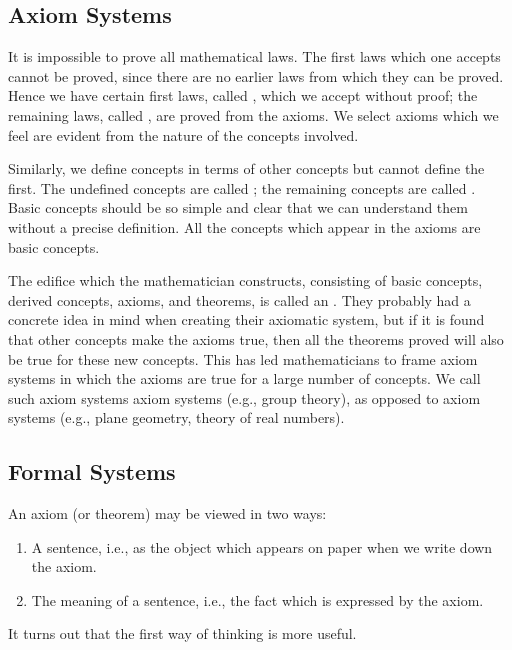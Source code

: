 \subsection{Axiom Systems}

It is impossible to prove all mathematical laws. The first laws which one accepts cannot be proved, since there are no earlier laws from which they can be proved.
Hence we have certain first laws, called , which we accept without proof; the remaining laws, called , are proved from the axioms.
We select axioms which we feel are evident from the nature of the concepts involved.

Similarly, we define concepts in terms of other concepts but cannot define the first.
The undefined concepts are called ;
the remaining concepts are called .
Basic concepts should be so simple and clear that we can understand them without a precise definition.
All the concepts which appear in the axioms are basic concepts.

The edifice which the mathematician constructs, consisting of basic concepts, derived concepts, axioms, and theorems, is called an .
They probably had a concrete idea in mind when creating their axiomatic system, but if it is found that other concepts make the axioms true, then all the theorems proved will also be true for these new concepts.
This has led mathematicians to frame axiom systems in which the axioms are true for a large number of concepts.
We call such axiom systems  axiom systems (e.g., group theory), as opposed to  axiom systems (e.g., plane geometry, theory of real numbers).


\subsection{Formal Systems}

\begin{shaded*}
An axiom (or theorem) may be viewed in two ways:
\begin{enumerate}
    \item A sentence, i.e., as the object which appears on paper when we write down the axiom.
    \item The meaning of a sentence, i.e., the fact which is expressed by the axiom.
\end{enumerate}
It turns out that the first way of thinking is more useful.
\end{shaded*}

